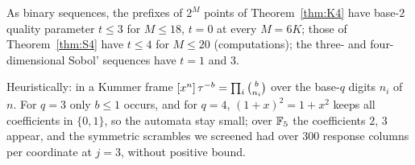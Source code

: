 As binary sequences, the prefixes of $2^M$ points of Theorem~\ref{thm:K4} have base-$2$ quality parameter $t\le3$ for $M\le18$, $t=0$ at every $M=6K$; those of Theorem~\ref{thm:S4} have $t\le4$ for $M\le20$ (computations); the three- and four-dimensional Sobol' sequences have $t=1$ and $3$.

\begin{remark}\label{rem:height}
Heuristically: in a Kummer frame $[x^{n}]\,\tau^{-b}=\prod_i\binom b{n_i}$ over the base-$q$ digits $n_i$ of $n$. For $q=3$ only $b\le1$ occurs, and for $q=4$, $(1+x)^2=1+x^2$ keeps all coefficients in $\{0,1\}$, so the automata stay small; over $\mathbb{F}_5$ the coefficients $2$, $3$ appear, and the symmetric scrambles we screened had over $300$ response columns per coordinate at $j=3$, without positive bound.
\end{remark}
